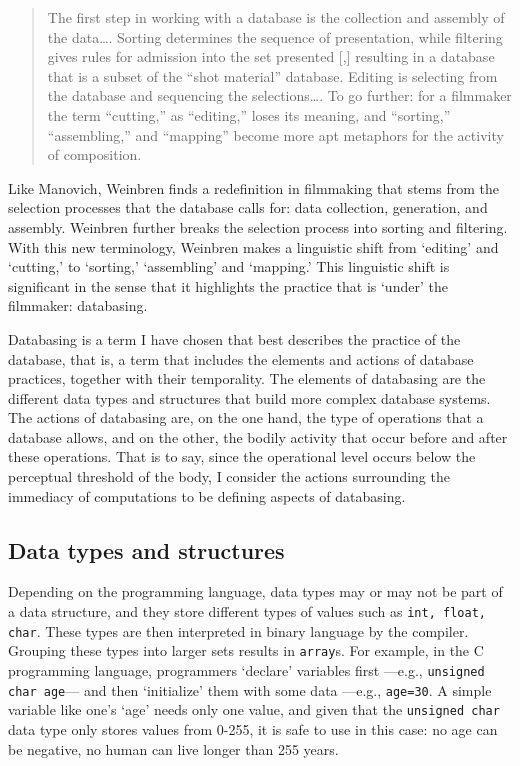\begin{quote}
	The first step in working with a database is the collection and assembly of the data\dots. Sorting determines the sequence of presentation, while filtering gives rules for admission into the set presented [,] resulting in a database that is a subset of the ``shot material'' database. Editing is selecting from the database and sequencing the selections\dots. To go further: for a filmmaker the term ``cutting,'' as ``editing,'' loses its meaning, and ``sorting,'' ``assembling,'' and ``mapping'' become more apt metaphors for the activity of composition. \parencite[71]{Wei07:Oce}
\end{quote}

Like Manovich, Weinbren finds a redefinition in filmmaking that stems from the selection processes that the database calls for: data collection, generation, and assembly. Weinbren further breaks the selection process into sorting and filtering. With this new terminology, Weinbren makes a linguistic shift from `editing' and `cutting,' to `sorting,' `assembling' and `mapping.' This linguistic shift is significant in the sense that it highlights the practice that is `under' the filmmaker: databasing. 

Databasing is a term I have chosen that best describes the practice of the database, that is, a term that includes the elements and actions of database practices, together with their temporality. The elements of databasing are the different data types and structures that build more complex database systems. The actions of databasing are, on the one hand, the type of operations that a database allows, and on the other, the bodily activity that occur before and after these operations. That is to say, since the operational level occurs below the perceptual threshold of the body, I consider the actions surrounding the immediacy of computations to be defining aspects of databasing.

\subsection{Data types and structures}

Depending on the programming language, data types may or may not be part of a data structure, and they store different types of values such as \texttt{int, float, char}. These types are then interpreted in binary language by the compiler. Grouping these types into larger sets results in \texttt{array}s. For example, in the C programming language, programmers `declare' variables first ---e.g., \texttt{unsigned char age}--- and then `initialize' them with some data ---e.g., \texttt{age=30}. A simple variable like one's `age' needs only one value, and given that the \texttt{unsigned char} data type only stores values from 0-255, it is safe to use in this case: no age can be negative, no human can live longer than 255 years.

